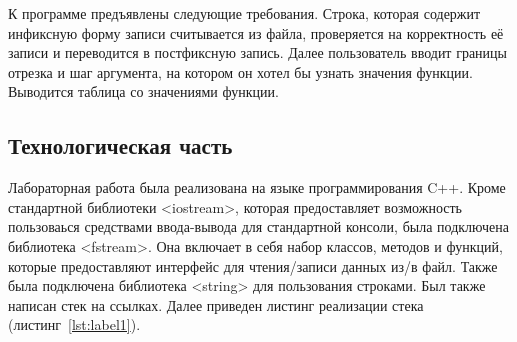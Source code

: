 \documentclass[12pt, a4paper]{article}
\begin{document}
К программе предъявлены следующие требования. Строка, которая содержит инфиксную форму записи считывается из файла, проверяется на корректность её записи и переводится в постфиксную запись. Далее пользователь вводит границы отрезка и шаг аргумента, на котором он хотел бы узнать значения функции. Выводится таблица со значениями функции.
\newpage
\begin{center}
    \section{Технологическая часть}
\end{center}

Лабораторная работа была реализована на языке программирования C++. Кроме стандартной библиотеки <iostream>, которая предоставляет возможность пользоваься средствами ввода-вывода для стандартной консоли, была подключена библиотека <fstream>. Она включает в себя набор классов, методов и функций, которые предоставляют интерфейс для чтения/записи данных из/в файл. Также была подключена библиотека <string> для пользования строками. Был также написан стек на ссылках.
Далее приведен листинг реализации стека (листинг~\ref{lst:label1}).
\end{document}
